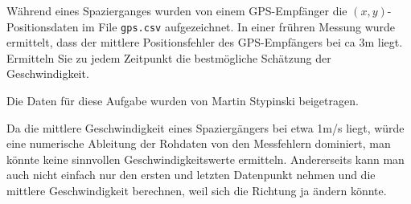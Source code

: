 Während eines Spazierganges wurden von einem GPS-Empfänger die
$(x,y)$-Positionsdaten im File \texttt{gps.csv} aufgezeichnet.
In einer frühren Messung wurde ermittelt, dass der mittlere Positionsfehler
des GPS-Empfängers bei ca 3m liegt.
Ermitteln Sie zu jedem Zeitpunkt die bestmögliche Schätzung 
der Geschwindigkeit.

Die Daten für diese Aufgabe wurden von Martin Stypinski beigetragen.

\begin{loesung}
Da die mittlere Geschwindigkeit eines Spaziergängers bei etwa 1m/s liegt,
würde eine numerische Ableitung der Rohdaten von den Messfehlern dominiert,
man könnte keine sinnvollen Geschwindigkeitswerte ermitteln.
Andererseits kann man auch nicht einfach nur den ersten und letzten
Datenpunkt nehmen und die mittlere Geschwindigkeit berechnen, weil
sich die Richtung ja ändern könnte.


\end{loesung}
